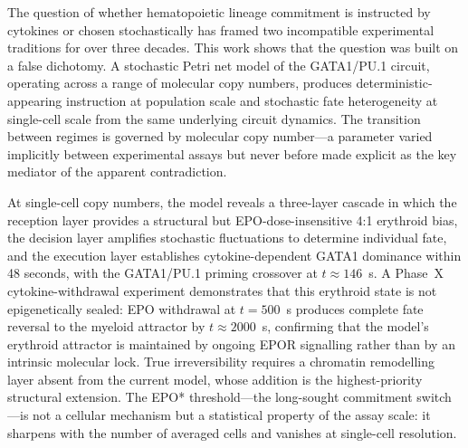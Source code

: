 
The question of whether hematopoietic lineage commitment is instructed by cytokines or chosen stochastically has framed two incompatible experimental traditions for over three decades. This work shows that the question was built on a false dichotomy. A stochastic Petri net model of the GATA1/PU.1 circuit, operating across a range of molecular copy numbers, produces deterministic-appearing instruction at population scale and stochastic fate heterogeneity at single-cell scale from the same underlying circuit dynamics. The transition between regimes is governed by molecular copy number---a parameter varied implicitly between experimental assays but never before made explicit as the key mediator of the apparent contradiction.

At single-cell copy numbers, the model reveals a three-layer cascade in which the reception layer provides a structural but EPO-dose-insensitive 4:1 erythroid bias, the decision layer amplifies stochastic fluctuations to determine individual fate, and the execution layer establishes cytokine-dependent GATA1 dominance within 48 seconds, with the GATA1/PU.1 priming crossover at $t \approx 146$~s. A Phase~X cytokine-withdrawal experiment demonstrates that this erythroid state is not epigenetically sealed: EPO withdrawal at $t=500$~s produces complete fate reversal to the myeloid attractor by $t\approx 2000$~s, confirming that the model's erythroid attractor is maintained by ongoing EPOR signalling rather than by an intrinsic molecular lock. True irreversibility requires a chromatin remodelling layer absent from the current model, whose addition is the highest-priority structural extension. The EPO* threshold---the long-sought commitment switch---is not a cellular mechanism but a statistical property of the assay scale: it sharpens with the number of averaged cells and vanishes at single-cell resolution.


